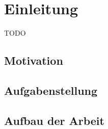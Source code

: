 \chapter{Einleitung}

TODO

\section{Motivation}

\section{Aufgabenstellung}

\section{Aufbau der Arbeit}

